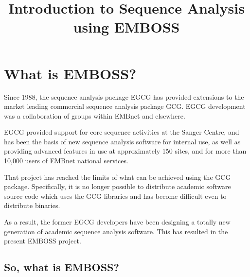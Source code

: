 \documentclass[12pt]{report}
\begin{document}
\newcommand{\type}[1]{{\bfseries #1}}
\newcommand{\unix}[1]{{\noindent\ttfamily unix \% #1}}
\newcommand{\screendump}[1]{{\noindent\ttfamily	#1}}
\newcommand{\scr}[1]{{\screendump{#1}}}
\newcommand{\file}[1]{{{\tt #1}}}
\newcommand{\prog}[1]{{{\tt #1}}}
\newcommand{\hsp}{{\hspace{0.5cm}}}
\newcommand{\first}[1]{{\htmladdnormallink{\scr{#1}}{http://www.uk.embnet.org/Software/EMBOSS/Apps/#1.html}}}
\begin{latexonly}
\end{latexonly}

\title{Introduction to Sequence	Analysis using EMBOSS}
\date{}

\maketitle

\chapter{What is EMBOSS?}
\label{chap:what_is}
Since 1988, the	sequence analysis package EGCG has provided extensions
to the market leading commercial sequence analysis package GCG.	EGCG
development was	a collaboration	of groups within EMBnet	and elsewhere.

EGCG provided support for core sequence	activities at the Sanger
Centre,	and has	been the basis of new sequence analysis	software for
internal use, as well as providing advanced features in	use at
approximately 150 sites, and for more than 10,000 users	of EMBnet
national services.

That project has reached the limits of what can	be achieved using the
GCG package. Specifically, it is no longer possible to distribute
academic software source code which uses the GCG libraries and has
become difficult even to distribute binaries.

As a result, the former	EGCG developers	have been designing a totally
new generation of academic sequence analysis software. This has
resulted in the	present	EMBOSS project.

\section{So, what is EMBOSS?}
\end{document}

